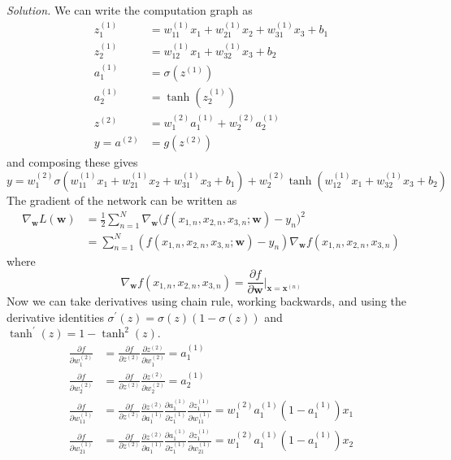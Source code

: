 \documentclass{article}
\theoremstyle{definition}
\theoremstyle{remark}
\theoremstyle{definition}
\newenvironment{solution}{\noindent \textit{Solution.}}{}
\begin{document}
    \begin{solution}
      We can write the computation graph as 
      \begin{align*} 
        z_1^{(1)} & = w_{11}^{(1)} x_1 + w_{21}^{(1)} x_2 + w_{31}^{(1)} x_3 + b_1 \\
        z_2^{(1)} & = w_{12}^{(1)} x_1 + w_{32}^{(1)} x_3 + b_2 \\
        a_1^{(1)} & = \sigma(z^{(1)})\\
        a_2^{(1)} & = \tanh(z_2^{(1)}) \\
        z^{(2)} & = w_{1}^{(2)} a_1^{(1)} + w_2^{(2)} a_2^{(1)} \\
        y = a^{(2)} & = g(z^{(2)})
      \end{align*}
      and composing these gives 
        \[y = w_1^{(2)} \sigma(w_{11}^{(1)} x_1  + w_{21}^{(1)} x_2 + w_{31}^{(1)} x_3 + b_1) + w_2^{(2)} \tanh(w_{12}^{(1)} x_1 + w_{32}^{(1)} x_3 + b_2) \]
      The gradient of the network can be written as 
      \begin{align*}
        \nabla_\mathbf{w} L(\mathbf{w}) & = \frac{1}{2} \sum_{n=1}^N \nabla_\mathbf{w} \big( f(x_{1, n}, x_{2, n}, x_{3, n}; \mathbf{w}) - y_n \big)^2 \\
        & = \sum_{n=1}^N (f(x_{1, n}, x_{2, n}, x_{3, n}; \mathbf{w}) - y_n) \nabla_\mathbf{w} f(x_{1, n}, x_{2, n}, x_{3, n})
      \end{align*}
      where 
      \[\nabla_\mathbf{w} f(x_{1, n}, x_{2, n}, x_{3, n}) = \frac{\partial f}{\partial \mathbf{w}} \bigg|_{\mathbf{x} = \mathbf{x}^{(n)}}\] 
      Now we can take derivatives using chain rule, working backwards, and using the derivative identities $\sigma^\prime (z)  = \sigma(z) (1 - \sigma(z))$ and $\tanh^\prime (z) = 1 - \tanh^2 (z)$. 
      \begin{align*}
          \frac{\partial f}{\partial w_1^{(2)}} & = \frac{\partial f}{\partial z^{(2)}} \frac{\partial z^{(2)}}{\partial w_1^{(2)}} = a_1^{(1)} \\
          \frac{\partial f}{\partial w_2^{(2)}} & = \frac{\partial f}{\partial z^{(2)}} \frac{\partial z^{(2)}}{\partial w_2^{(2)}} = a_2^{(1)} \\ 
          \frac{\partial f}{\partial w_{11}^{(1)}} & = \frac{\partial f}{\partial z^{(2)}} \frac{\partial z^{(2)}}{\partial a^{(1)}_1} \frac{\partial a^{(1)}_1}{\partial z_1^{(1)}} \frac{\partial z_1^{(1)}}{\partial w_{11}^{(1)}} = w_1^{(2)} a_1^{(1)} (1 - a_1^{(1)}) x_1\\
          \frac{\partial f}{\partial w_{21}^{(1)}} & = \frac{\partial f}{\partial z^{(2)}} \frac{\partial z^{(2)}}{\partial a^{(1)}_1} \frac{\partial a^{(1)}_1}{\partial z_1^{(1)}} \frac{\partial z_1^{(1)}}{\partial w_{21}^{(1)}} = w_1^{(2)} a_1^{(1)} (1 - a_1^{(1)}) x_2\\

\end{align*}
\end{solution}
\end{document}
